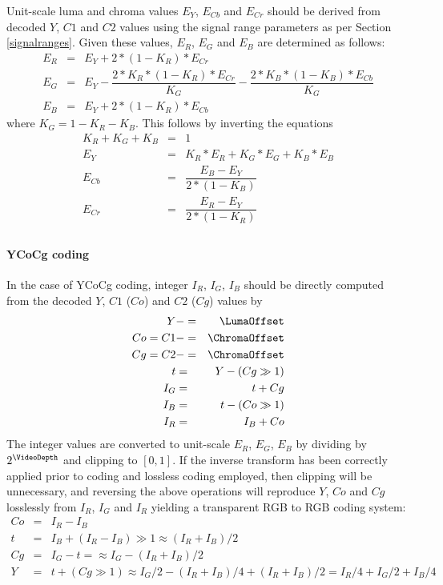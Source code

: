\begin{informative*}
Unit-scale luma and chroma values $E_Y$, $E_{Cb}$ and $E_{Cr}$ should be
derived from decoded $Y$, $C1$ and $C2$ values using the signal range parameters
as per Section \ref{signalranges}. Given these values, $E_R$, $E_G$ and $E_B$ are
determined as follows:
\begin{eqnarray*}
E_R & = & E_Y + 2*(1-K_R)*E_{Cr} \\
E_G & = & E_Y - \dfrac{2*K_R*(1-K_R)*E_{Cr}}{K_G}-\dfrac{2*K_B*(1-K_B)*E_{Cb}}{K_G} \\
E_B & = & E_Y + 2*(1-K_R)*E_{Cb} 
\end{eqnarray*}
where $K_G=1-K_R-K_B$.
This follows by inverting the equations 
\begin{eqnarray*}
K_R+K_G+K_B & = & 1 \\
E_Y & = & K_R*E_R+K_G*E_G+K_B*E_B \\
E_{Cb} & = & \dfrac{E_B - E_Y}{2*(1-K_B)} \\
E_{Cr} & = & \dfrac{E_R - E_Y}{2*(1-K_R)} \\
\end{eqnarray*}

\paragraph{YCoCg coding\\}
In the case of YCoCg coding, integer $I_R$, $I_G$, $I_B$ should be directly computed from
the decoded $Y$, $C1$ ($Co$) and $C2$ ($Cg$) values by
\begin{eqnarray*}
Y & -= & \LumaOffset \\
Co=C1 & -= & \ChromaOffset \\
Cg=C2 & -= & \ChromaOffset \\
t & = & Y-(Cg\gg1) \\
I_G & = & t+Cg \\
I_B & = & t-(Co\gg1) \\
I_R & = & I_B+Co
\end{eqnarray*}
The integer values are converted to unit-scale $E_R$, $E_G$, $E_B$ by dividing by 
$2^\VideoDepth$ and clipping to $[0,1]$.
If the inverse transform has been correctly
applied prior to coding and lossless coding employed, then clipping will
be unnecessary, and reversing the above operations will reproduce $Y$, $Co$ and $Cg$
losslessly from $I_R$, $I_G$ and $I_R$ yielding a transparent RGB to RGB coding system:
\begin{eqnarray*}
Co & = & I_R-I_B \\
t & = & I_B+(I_R-I_B)\gg1 \approx (I_R+I_B)/2\\
Cg & = & I_G-t = \approx I_G-(I_R+I_B)/2\\
Y & = & t+(Cg\gg1) \approx I_G/2-(I_R+I_B)/4+(I_R+I_B)/2=I_R/4+I_G/2+I_B/4
\end{eqnarray*}


\end{informative*}
